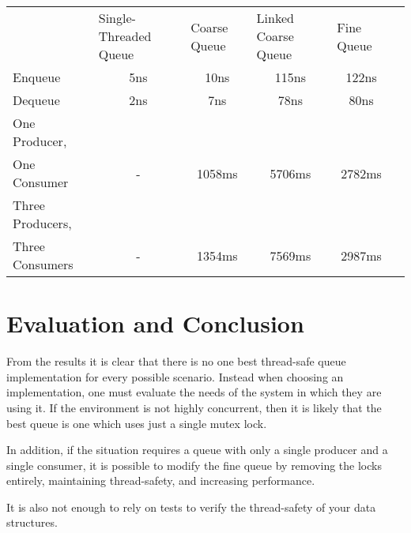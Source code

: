 \documentclass{article}
\begin{document}
\begin{table}
\centering
\begin{tabular}{lccccl}
                                 & \multicolumn{1}{l}{Single-Threaded Queue} & \multicolumn{1}{l}{Coarse Queue} & \multicolumn{1}{l}{Linked Coarse Queue} & \multicolumn{1}{l}{Fine Queue} &   \\
Enqueue                          & 5ns                                       & 10ns                             & 115ns                                   & 122ns                          &   \\
Dequeue                          & 2ns                                       & 7ns                              & 78ns                                    & 80ns                           &   \\
One Producer,\\ One Consumer       & -                                         & 1058ms                           & 5706ms                                  & 2782ms                         &   \\
Three Producers,\\ Three Consumers & -                                         & 1354ms                           & 7569ms                                  & 2987ms                         &  
\end{tabular}
\end{table}

\section{Evaluation and Conclusion}
From the results it is clear that there is no one best thread-safe queue
implementation for every possible scenario. Instead when choosing an
implementation, one must evaluate the needs of the system in which they are
using it. If the environment is not highly concurrent, then it is likely that
the best queue is one which uses just a single mutex lock.  

In addition, if the situation requires a queue with only a single producer and
a single consumer, it is possible to modify the fine queue by removing the locks
entirely, maintaining thread-safety, and increasing performance.

It is also not enough to rely on tests to verify the thread-safety of your
data structures.  

\nocite{*}

\end{document}
